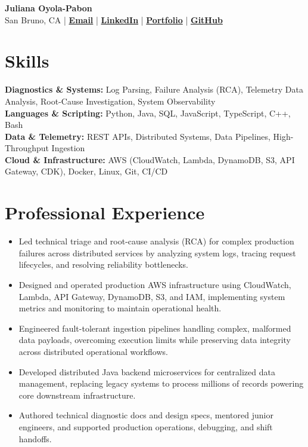 \documentclass[10pt,letterpaper]{article}
\begin{document}
\begin{center}
{\LARGE\bfseries\color{Accent} Juliana Oyola-Pabon}\\[4pt]
San Bruno, CA
\;|\;
\href{mailto:julianaaoyola@gmail.com}{\textbf{Email}}
\;|\;
\href{https://linkedin.com/in/julianaoyola}{\textbf{LinkedIn}}
\;|\;
\href{https://juliana-portfolio-two.vercel.app/}{\textbf{Portfolio}}
\;|\;
\href{https://github.com/julsoyola}{\textbf{GitHub}}
\end{center}

\section*{Skills}

\textbf{Diagnostics \& Systems:} Log Parsing, Failure Analysis (RCA), Telemetry Data Analysis, Root-Cause Investigation, System Observability \\
\textbf{Languages \& Scripting:} Python, Java, SQL, JavaScript, TypeScript, C++, Bash \\
\textbf{Data \& Telemetry:} REST APIs, Distributed Systems, Data Pipelines, High-Throughput Ingestion \\
\textbf{Cloud \& Infrastructure:} AWS (CloudWatch, Lambda, DynamoDB, S3, API Gateway, CDK), Docker, Linux, Git, CI/CD

\section*{Professional Experience}


\begin{itemize}
\item Led technical triage and root-cause analysis (RCA) for complex production failures across distributed services by analyzing system logs, tracing request lifecycles, and resolving reliability bottlenecks.
\item Designed and operated production AWS infrastructure using CloudWatch, Lambda, API Gateway, DynamoDB, S3, and IAM, implementing system metrics and monitoring to maintain operational health.
\item Engineered fault-tolerant ingestion pipelines handling complex, malformed data payloads, overcoming execution limits while preserving data integrity across distributed operational workflows.
\item Developed distributed Java backend microservices for centralized data management, replacing legacy systems to process millions of records powering core downstream infrastructure.
\item Authored technical diagnostic docs and design specs, mentored junior engineers, and supported production operations, debugging, and shift handoffs.
\end{itemize}
\end{document}
